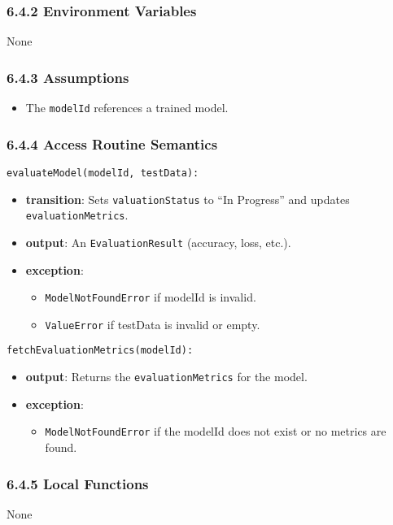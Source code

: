\documentclass[12pt, titlepage]{article}
\begin{document}
\subsubsection{6.4.2 Environment Variables}
None

\subsubsection{6.4.3 Assumptions}
\begin{itemize}
    \item The \texttt{modelId} references a trained model.
\end{itemize}

\subsubsection{6.4.4 Access Routine Semantics}
\noindent \texttt{evaluateModel(modelId, testData):}
\begin{itemize}
    \item \textbf{transition}: Sets \texttt{valuationStatus} to ``In Progress'' and updates \texttt{evaluationMetrics}.
    \item \textbf{output}: An \texttt{EvaluationResult} (accuracy, loss, etc.).
    \item \textbf{exception}:
    \begin{itemize}
        \item \texttt{ModelNotFoundError} if modelId is invalid.
        \item \texttt{ValueError} if testData is invalid or empty.
    \end{itemize}
\end{itemize}

\noindent \texttt{fetchEvaluationMetrics(modelId):}
\begin{itemize}
    \item \textbf{output}: Returns the \texttt{evaluationMetrics} for the model.
    \item \textbf{exception}:
    \begin{itemize}
        \item \texttt{ModelNotFoundError} if the modelId does not exist or no metrics are found.
    \end{itemize}
\end{itemize}

\subsubsection{6.4.5 Local Functions}
None
\end{document}
